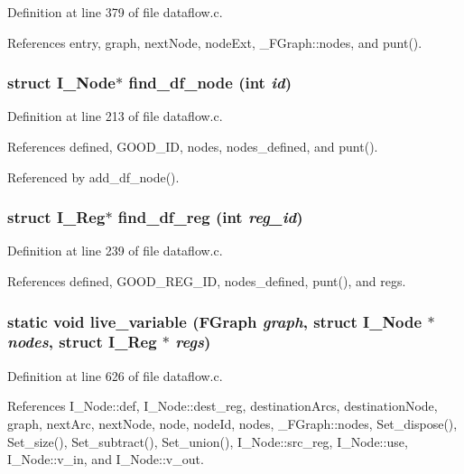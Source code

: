 Definition at line 379 of file dataflow.c.

References entry, graph, next\-Node, node\-Ext, \_\-FGraph::nodes, and punt().
\subsubsection{\setlength{\rightskip}{0pt plus 5cm}struct \bf{I\_\-Node}$\ast$ find\_\-df\_\-node (int {\em id})}\label{dataflow_8c_831f2c23f46102a82ab271b75dcaf9bd}




Definition at line 213 of file dataflow.c.

References defined, GOOD\_\-ID, nodes, nodes\_\-defined, and punt().

Referenced by add\_\-df\_\-node().
\subsubsection{\setlength{\rightskip}{0pt plus 5cm}struct \bf{I\_\-Reg}$\ast$ find\_\-df\_\-reg (int {\em reg\_\-id})}\label{dataflow_8c_fd2051a50cece4bb251d07694aaaf671}




Definition at line 239 of file dataflow.c.

References defined, GOOD\_\-REG\_\-ID, nodes\_\-defined, punt(), and regs.
\subsubsection{\setlength{\rightskip}{0pt plus 5cm}static void live\_\-variable (\bf{FGraph} {\em graph}, struct \bf{I\_\-Node} $\ast$ {\em nodes}, struct \bf{I\_\-Reg} $\ast$ {\em regs})\hspace{0.3cm}{\tt  [static]}}\label{dataflow_8c_7980e5c580070c57f393077571c169dc}




Definition at line 626 of file dataflow.c.

References I\_\-Node::def, I\_\-Node::dest\_\-reg, destination\-Arcs, destination\-Node, graph, next\-Arc, next\-Node, node, node\-Id, nodes, \_\-FGraph::nodes, Set\_\-dispose(), Set\_\-size(), Set\_\-subtract(), Set\_\-union(), I\_\-Node::src\_\-reg, I\_\-Node::use, I\_\-Node::v\_\-in, and I\_\-Node::v\_\-out.

